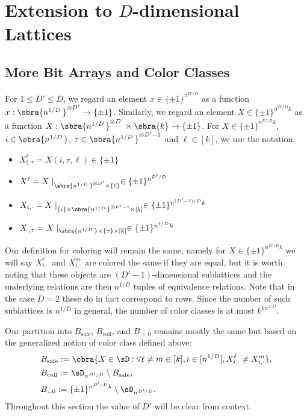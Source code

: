 
\section{Extension to $D$-dimensional Lattices}
\label{sec:generallattices}

\subsection{More Bit Arrays and Color Classes}

For $1\leq D' \leq D$, we regard an element $x \in \{\pm1\}^{n^{D'/D}}$ as a function $x : \sbra{n^{1/D}\,}^{\otimes D'} \to \{\pm1\}$. 
Similarly, we regard an element $X \in \{\pm1\}^{n^{D'/D}k}$ as a function $X : \sbra{n^{1/D}\,}^{\otimes D'} \times \sbra{k} \to \{\pm1\}$. 
For $X \in \{\pm1\}^{n^{D'/D}k}$, $i \in \sbra{n^{1/D}\,}$, $\tau \in \sbra{n^{1/D}\,}^{\otimes D'-1}$ and $\ell \in [k]$, we use the notation:
\begin{itemize}
    \item $X^\ell_{i, \tau} = X(i, \tau, \ell) \in \{\pm1\}$
    \item $X^\ell = X \mid_{\sbra{n^{1/D}\,}^{\otimes D'} \times \{\ell\}} \in \{\pm1\}^{n^{D'/D}}$
    \item $X_{i, \cdot} = X \mid_{\{i\} \times \sbra{n^{1/D}\,}^{\otimes D'-1} \times [k]} \in \{\pm1\}^{n^{(D'-1)/D}k}$
    \item $X_{\cdot, \tau} = X \mid_{\sbra{n^{1/D}\,} \times \{\tau\} \times [k]} \in \{\pm1\}^{n^{1/D}k}$
\end{itemize}

Our definition for coloring will remain the same, namely for $X \in \{\pm1\}^{n^{D'/D}k}$ we will say $X^\ell_{i, \cdot}$ and $X^m_{i, \cdot}$ are colored the same if they are equal, but it is worth noting that these objects are $(D'-1)$-dimensional sublattices and the underlying relations are then $n^{1/D}$ tuples of equivalence relations. Note that in the case $D = 2$ these do in fact correspond to rows. Since the number of such sublattices is $n^{1/D}$ in general, the number of color classes is at most $k^{kn^{1/D}}$.

Our partition into $B_{\mathrm{safe}}$, $B_{\mathrm{coll}}$, and $B_{=0}$ remains mostly the same but based on the generalized notion of color class defined above:
\begin{align*}
    &B_\text{safe} := \cbra{X \in \sD : \forall \ell \neq m \in [k], i \in [n^{1/D}], X^\ell_{i, \cdot} \neq X^m_{i, \cdot}},\\
    &B_\text{coll} := \sD_{n^{D'/D}} \setminus B_\text{safe},\\
    &B_{=0} := \{\pm1\}^{n^{D'/D}k} \setminus \sD_{n^{D'/D}}.
\end{align*}
Throughout this section the value of $D'$ will be clear from context.


